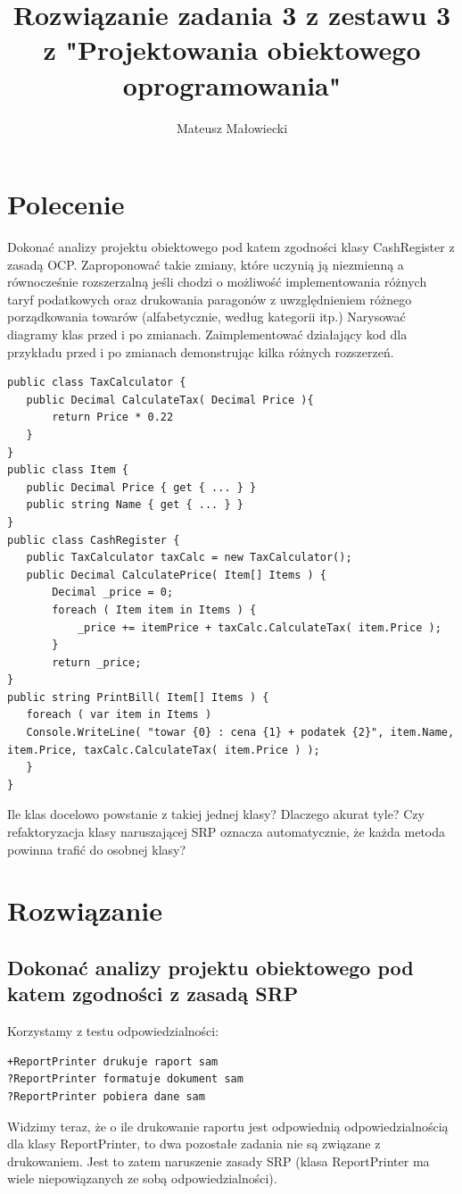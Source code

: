 \documentclass[10pt, a4paper]{article}
\title{Rozwiązanie zadania 3 z zestawu 3 z "Projektowania obiektowego oprogramowania"}
\author{Mateusz Małowiecki}
\begin{document}
\maketitle
\section*{Polecenie}
Dokonać analizy projektu obiektowego pod katem zgodności klasy CashRegister z zasadą OCP. Zaproponować takie zmiany, które uczynią ją
niezmienną a równocześnie rozszerzalną jeśli chodzi o możliwość implementowania różnych
taryf podatkowych oraz drukowania paragonów z uwzględnieniem różnego porządkowania
towarów (alfabetycznie, według kategorii itp.)
Narysować diagramy klas przed i po zmianach. Zaimplementować działający kod dla przykładu przed i po zmianach demonstrując kilka różnych rozszerzeń.
\begin{verbatim}
public class TaxCalculator {
   public Decimal CalculateTax( Decimal Price ){
       return Price * 0.22 
   }
}
public class Item {
   public Decimal Price { get { ... } }
   public string Name { get { ... } }
}
public class CashRegister {
   public TaxCalculator taxCalc = new TaxCalculator();
   public Decimal CalculatePrice( Item[] Items ) {
       Decimal _price = 0;
       foreach ( Item item in Items ) {
           _price += itemPrice + taxCalc.CalculateTax( item.Price );
       }
       return _price;
}
public string PrintBill( Item[] Items ) {
   foreach ( var item in Items )
   Console.WriteLine( "towar {0} : cena {1} + podatek {2}", item.Name, item.Price, taxCalc.CalculateTax( item.Price ) );
   }
}
\end{verbatim}
Ile klas docelowo powstanie z takiej jednej klasy? Dlaczego akurat tyle? Czy refaktoryzacja klasy naruszającej SRP oznacza automatycznie, że każda metoda powinna trafić do
osobnej klasy?

\section*{Rozwiązanie}
\subsection*{Dokonać analizy projektu obiektowego pod
katem zgodności z zasadą SRP}
Korzystamy z testu odpowiedzialności:
\begin{verbatim}
+ReportPrinter drukuje raport sam
?ReportPrinter formatuje dokument sam
?ReportPrinter pobiera dane sam
\end{verbatim}
Widzimy teraz, że o ile drukowanie raportu jest odpowiednią odpowiedzialnością dla klasy ReportPrinter, to dwa pozostałe zadania nie są związane z drukowaniem. Jest to zatem naruszenie zasady SRP (klasa ReportPrinter ma wiele niepowiązanych ze sobą odpowiedzialności).
\end{document}

